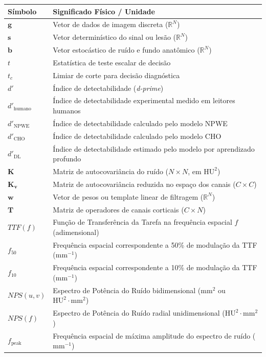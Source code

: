 \documentclass[
  12pt,
  a4paper,
  oneside
]{report}
\begin{document}
\begin{longtable}{ll}
\toprule
\textbf{Símbolo} & \textbf{Significado Físico / Unidade} \\
\midrule
\endhead
$\mathbf{g}$ & Vetor de dados de imagem discreta ($\mathbb{R}^N$) \\
$\mathbf{s}$ & Vetor determinístico do sinal ou lesão ($\mathbb{R}^N$) \\
$\mathbf{b}$ & Vetor estocástico de ruído e fundo anatômico ($\mathbb{R}^N$) \\
$t$ & Estatística de teste escalar de decisão \\
$t_c$ & Limiar de corte para decisão diagnóstica \\
$d'$ & Índice de detectabilidade (\emph{d-prime}) \\
$d'_{\text{humano}}$ & Índice de detectabilidade experimental medido em leitores humanos \\
$d'_{\text{NPWE}}$ & Índice de detectabilidade calculado pelo modelo NPWE \\
$d'_{\text{CHO}}$ & Índice de detectabilidade calculado pelo modelo CHO \\
$d'_{\text{DL}}$ & Índice de detectabilidade estimado pelo modelo por aprendizado profundo \\
$\mathbf{K}$ & Matriz de autocovariância do ruído ($N \times N$, em $\text{HU}^2$) \\
$\mathbf{K}_{\mathbf{v}}$ & Matriz de autocovariância reduzida no espaço dos canais ($C \times C$) \\
$\mathbf{w}$ & Vetor de pesos ou template linear de filtragem ($\mathbb{R}^N$) \\
$\mathbf{T}$ & Matriz de operadores de canais corticais ($C \times N$) \\
$TTF(f)$ & Função de Transferência da Tarefa na frequência espacial $f$ (adimensional) \\
$f_{50}$ & Frequência espacial correspondente a 50\% de modulação da TTF ($\text{mm}^{-1}$) \\
$f_{10}$ & Frequência espacial correspondente a 10\% de modulação da TTF ($\text{mm}^{-1}$) \\
$NPS(u, v)$ & Espectro de Potência do Ruído bidimensional ($\text{mm}^2$ ou $\text{HU}^2\cdot\text{mm}^2$) \\
$NPS(f)$ & Espectro de Potência do Ruído radial unidimensional ($\text{HU}^2\cdot\text{mm}^2$) \\
$f_{\text{peak}}$ & Frequência espacial de máxima amplitude do espectro de ruído ($\text{mm}^{-1}$) \\

\end{longtable}
\end{document}
